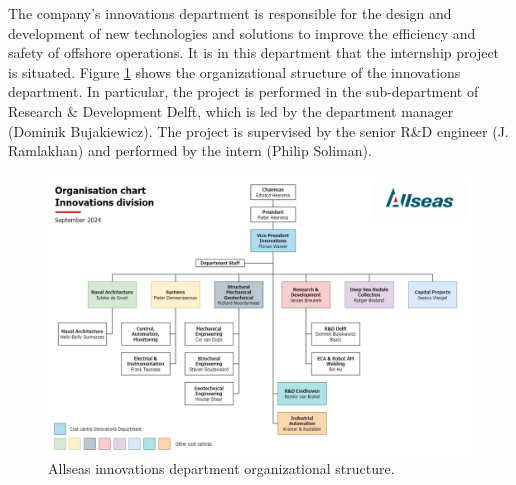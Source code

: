 The company's innovations department is responsible for the design and
development of new technologies and solutions to improve the efficiency and
safety of offshore operations. It is in this department that the internship
project is situated. Figure \ref{fig:allseas_innovations} shows the
organizational structure of the innovations department. In particular, the
project is performed in the sub-department of Research \& Development Delft,
which is led by the department manager (Dominik Bujakiewicz). The project is
supervised by the senior R\&D engineer (J. Ramlakhan) and performed by the
intern (Philip Soliman).
\begin{figure}[H]
    \centering
    \includegraphics[width=\textwidth]{images/allseas_innovations_dep.png}
    \caption{Allseas innovations department organizational structure.}
    \label{fig:allseas_innovations}
\end{figure}
